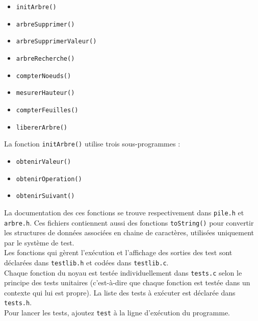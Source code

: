 \documentclass[a4paper,11pt] {article}
\begin{document}
\begin{itemize}
    \item \verb#initArbre()#
    \item \verb#arbreSupprimer()#
    \item \verb#arbreSupprimerValeur()#
    \item \verb#arbreRecherche()#
    \item \verb#compterNoeuds()#
    \item \verb#mesurerHauteur()#
    \item \verb#compterFeuilles()#
    \item \verb#libererArbre()#
\end{itemize}

\vspace{0.5cm}

La fonction \verb#initArbre()# utilise trois sous-programmes : 

\vspace{0.5cm}

\begin{itemize}
    \item \verb#obtenirValeur()#
    \item \verb#obtenirOperation()#
    \item \verb#obtenirSuivant()#
\end{itemize}

\vspace{0.5cm}

La documentation des ces fonctions se trouve respectivement dans \verb#pile.h# et \verb#arbre.h#. Ces fichiers contiennent aussi des fonctions \verb#toString()# pour convertir les structures de données associées en chaine de caractères, utilisées uniquement par le système de test.\\

Les fonctions qui gèrent l'exécution et l'affichage des sorties des test sont déclarées dans \verb#testlib.h# et codées dans \verb#testlib.c#.\\

Chaque fonction du noyau est testée individuellement dans \verb#tests.c# selon le principe des tests unitaires (c'est-à-dire que chaque fonction est testée dans un contexte qui lui est propre). La liste des tests à exécuter est déclarée dans \verb#tests.h#.\\

Pour lancer les tests, ajoutez \verb#test# à la ligne d'exécution du programme.\\
\end{document}
